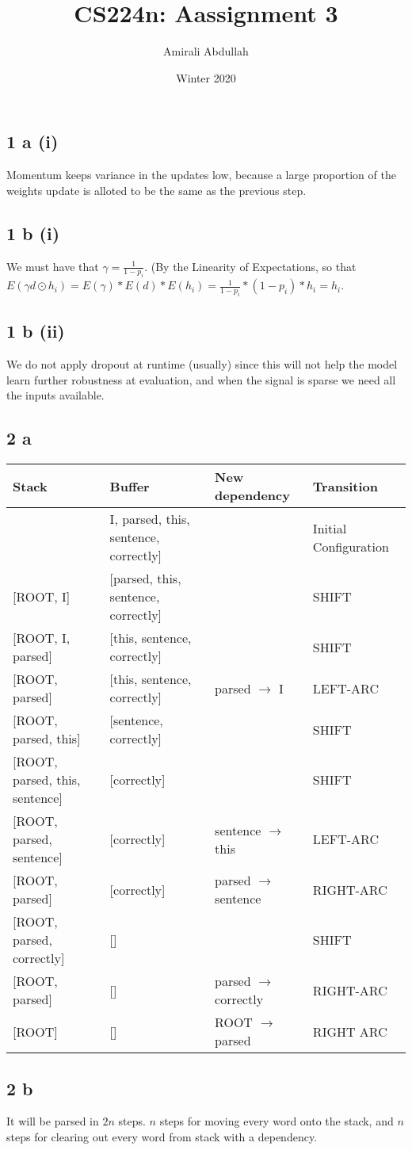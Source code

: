 \documentclass{article}
\title{CS224n: Aassignment 3}
\author{Amirali Abdullah}
\date{Winter 2020}
\begin{document}
\maketitle%

\subsection*{1 a (i)}
Momentum keeps variance in the updates low, because a large proportion of the weights update is alloted to be the same as the previous step.

\subsection*{1 b (i)}
We must have that $\gamma = \frac{1}{1 - p_i}$. (By the Linearity of Expectations, so that $E (\gamma d \odot h_i)  = E(\gamma)*E(d)*E(h_i) = \frac{1}{1 - p_i} * (1 - p_i) * h_i = h_i$.

\subsection*{1 b (ii)}
We do not apply dropout at runtime (usually) since this will not help the model learn further robustness at evaluation, and when the signal is sparse we need all the inputs available.

\subsection*{2 a}
\begin{tabular}{ l|l|l|l } 
 \hline
 Stack & Buffer & New dependency & Transition \\ 
 \hline
 [ROOT] & I, parsed, this, sentence, correctly] &  & Initial Configuration \\ 
 {[ROOT, I]}  & {[parsed, this, sentence, correctly]} &  & SHIFT \\
 {[ROOT, I, parsed]}  & {[this, sentence, correctly]} &  & SHIFT \\
 {[ROOT, parsed]}  & {[this, sentence, correctly]} & parsed $\rightarrow$ I & LEFT-ARC \\ 
 {[ROOT, parsed, this]}  & {[sentence, correctly]} &  & SHIFT \\
 {[ROOT, parsed, this, sentence]}  & {[correctly]} &  & SHIFT \\
 {[ROOT, parsed, sentence]}  & {[correctly]} & sentence $\rightarrow$ this & LEFT-ARC \\
 {[ROOT, parsed]}  & {[correctly]} & parsed $\rightarrow$ sentence & RIGHT-ARC \\
 {[ROOT, parsed, correctly]}  & {[]} & & SHIFT \\
 {[ROOT, parsed]}  & {[]} & parsed $\rightarrow$ correctly & RIGHT-ARC \\
 {[ROOT]}  & {[]} & ROOT $\rightarrow$ parsed & RIGHT ARC \\
 \hline
\end{tabular}

\subsection*{2 b}
It will be parsed in $2 n$ steps. $n$ steps for moving every word onto the stack, and $n$ steps for clearing out every word from stack with a dependency.
\end{document}
